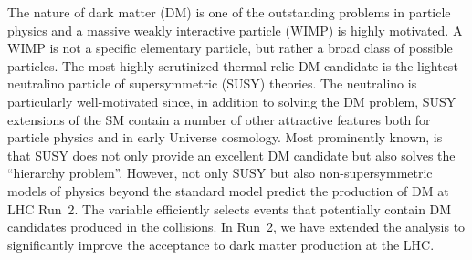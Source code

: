 The nature of dark matter (DM) is one of the outstanding problems in
particle physics and a massive weakly interactive particle (WIMP) is
highly motivated. A WIMP is not a specific elementary particle, but
rather a broad class of possible particles. The most highly
scrutinized thermal relic DM candidate is the lightest neutralino
particle of supersymmetric (SUSY) theories. The neutralino is
particularly well-motivated since, in addition to solving the DM
problem, SUSY extensions of the SM contain a number of other
attractive features both for particle physics and in early Universe
cosmology. Most prominently known, is that SUSY does not only provide
an excellent DM candidate but also solves the ``hierarchy problem''.
However, not only SUSY but also non-supersymmetric models of physics
beyond the standard model predict the production of DM at LHC Run~2.
The \alphat variable efficiently selects events that potentially
contain DM candidates produced in the collisions. In Run~2, we have extended
the \alphat analysis to significantly improve the acceptance to dark
matter production at the LHC. 


